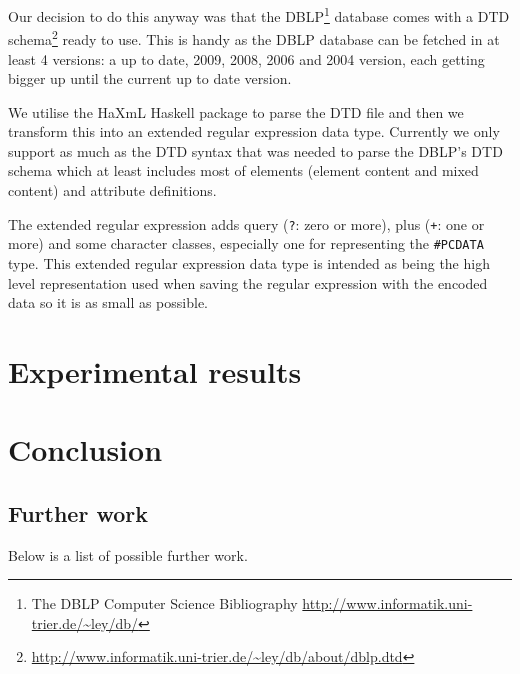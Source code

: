\documentclass[a4paper, oneside]{memoir}
\theoremstyle{definition}
\begin{document}
Our decision to do this anyway was that the DBLP\footnote{The DBLP Computer
  Science Bibliography \url{http://www.informatik.uni-trier.de/~ley/db/}}
database comes with a DTD
schema\footnote{\url{http://www.informatik.uni-trier.de/~ley/db/about/dblp.dtd}}
ready to use. This is handy as the DBLP database can be fetched in at least 4
versions: a up to date, 2009, 2008, 2006 and 2004 version, each getting bigger
up until the current up to date version.

We utilise the HaXmL Haskell package to parse the DTD file and then we transform
this into an extended regular expression data type. Currently we only support as
much as the DTD syntax that was needed to parse the DBLP's DTD schema which at
least includes most of elements (element content and mixed content) and
attribute definitions.

The extended regular expression adds query (\texttt{?}: zero or more), plus
(\texttt{+}: one or more) and some character classes, especially one for
representing the \texttt{\#PCDATA} type. This extended regular expression data
type is intended as being the high level representation used when saving the
regular expression with the encoded data so it is as small as possible.

\chapter{Experimental results}
\label{sec:experimental_results}

% 

\chapter{Conclusion}
\label{sec:conclusion}

\section{Further work}

Below is a list of possible further work.
\end{document}

